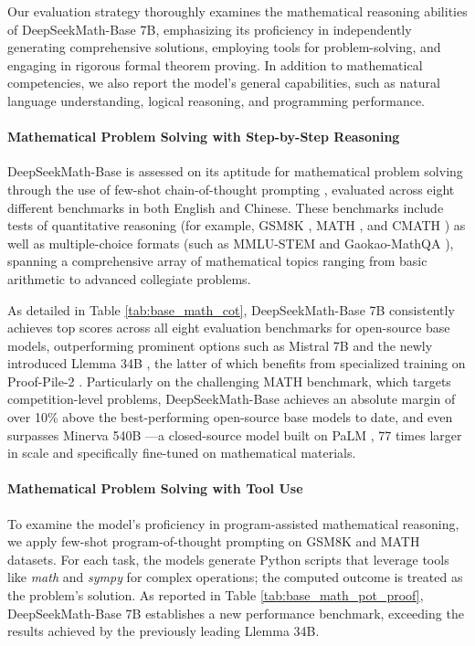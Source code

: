 \begin{itemize}[topsep=0pt]
Our evaluation strategy thoroughly examines the mathematical reasoning abilities of DeepSeekMath-Base 7B, emphasizing its proficiency in independently generating comprehensive solutions, employing tools for problem-solving, and engaging in rigorous formal theorem proving. In addition to mathematical competencies, we also report the model’s general capabilities, such as natural language understanding, logical reasoning, and programming performance.

\paragraph{Mathematical Problem Solving with Step-by-Step Reasoning}

DeepSeekMath-Base is assessed on its aptitude for mathematical problem solving through the use of few-shot chain-of-thought prompting \citep{cot}, evaluated across eight different benchmarks in both English and Chinese. These benchmarks include tests of quantitative reasoning (for example, GSM8K \citep{gsm8k}, MATH \citep{MATH}, and CMATH \citep{wei2023cmath}) as well as multiple-choice formats (such as MMLU-STEM \citep{mmlu} and Gaokao-MathQA \citep{agieval}), spanning a comprehensive array of mathematical topics ranging from basic arithmetic to advanced collegiate problems.

As detailed in Table \ref{tab:base_math_cot}, DeepSeekMath-Base 7B consistently achieves top scores across all eight evaluation benchmarks for open-source base models, outperforming prominent options such as Mistral 7B \citep{mistral} and the newly introduced Llemma 34B \citep{llemma}, the latter of which benefits from specialized training on Proof-Pile-2 \citep{llemma}. Particularly on the challenging MATH benchmark, which targets competition-level problems, DeepSeekMath-Base achieves an absolute margin of over 10\% above the best-performing open-source base models to date, and even surpasses Minerva 540B \citep{minerva}—a closed-source model built on PaLM \citep{palm}, 77 times larger in scale and specifically fine-tuned on mathematical materials.

\paragraph{Mathematical Problem Solving with Tool Use} To examine the model’s proficiency in program-assisted mathematical reasoning, we apply few-shot program-of-thought prompting \citep{pot,pal} on GSM8K and MATH datasets. For each task, the models generate Python scripts that leverage tools like \textit{math} and \textit{sympy} for complex operations; the computed outcome is treated as the problem’s solution. As reported in Table \ref{tab:base_math_pot_proof}, DeepSeekMath-Base 7B establishes a new performance benchmark, exceeding the results achieved by the previously leading Llemma 34B.


\end{itemize}
